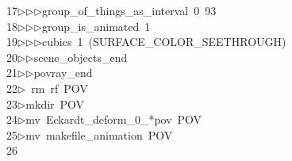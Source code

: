 \begin{tabbing}
17\>$\triangleright$\>$\triangleright$\>$\triangleright$\>group\_of\_things\_as\_interval\ 0\ 93\ \\[0pt]
18\>$\triangleright$\>$\triangleright$\>$\triangleright$\>group\_is\_animated\ 1\ \\[0pt]
19\>$\triangleright$\>$\triangleright$\>$\triangleright$\>cubics\ 1\ (SURFACE\_COLOR\_SEETHROUGH)\ \\[0pt]
20\>$\triangleright$\>$\triangleright$\>scene\_objects\_end\ \\[0pt]
21\>$\triangleright$\>$\triangleright$\>povray\_end\\[0pt]
22\>$\triangleright$\>\ rm\ rf\ POV\\[0pt]
23\>$\triangleright$\>mkdir\ POV\\[0pt]
24\>$\triangleright$\>mv\ Eckardt\_deform\_0\_*pov\ POV\\[0pt]
25\>$\triangleright$\>mv\ makefile\_animation\ POV\\[0pt]
26\>\end{tabbing}

